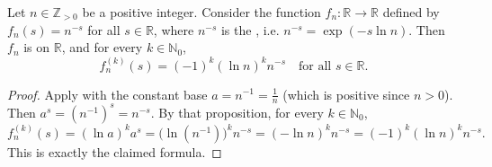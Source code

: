 \begin{proposition}
\label{proposition:derivatives_of_n_to_the_minus_s}
Let $n \in \mathbb{Z}_{> 0}$ be a positive integer. Consider the function
$f_n : \mathbb{R} \to \mathbb{R}$ defined by $f_n(s) = n^{-s}$ for all $s \in \mathbb{R}$,
where $n^{-s}$ is the , i.e. $n^{-s} = \exp(-s \ln n)$.
Then $f_n$ is  on $\mathbb{R}$, and for every $k \in \mathbb{N}_0$,
$$f_n^{(k)}(s) = (-1)^k (\ln n)^k n^{-s} \quad \text{for all } s \in \mathbb{R}.$$
\end{proposition}
\begin{proof}
Apply  with the constant base $a = n^{-1} = \frac{1}{n}$ (which is positive since $n > 0$). Then $a^s = (n^{-1})^s = n^{-s}$. By that proposition, for every $k \in \mathbb{N}_0$,
$$f_n^{(k)}(s) = (\ln a)^k a^s = \bigl(\ln(n^{-1})\bigr)^k n^{-s} = (-\ln n)^k n^{-s} = (-1)^k (\ln n)^k n^{-s}.$$
This is exactly the claimed formula.
\end{proof}